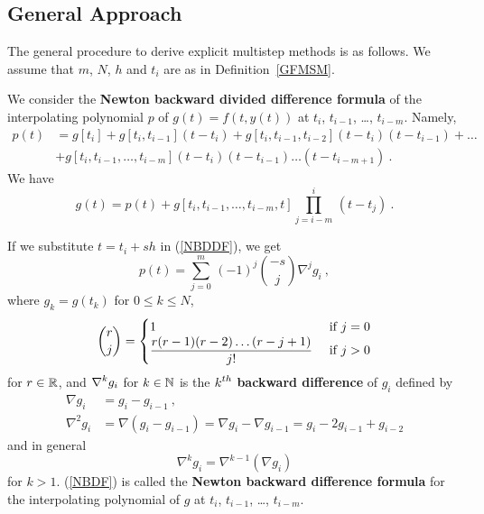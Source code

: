 \subsection{General Approach}

The general procedure to derive explicit multistep methods is as
follows.  We assume that $m$, $N$, $h$ and $t_i$ are as in
Definition~\ref{GFMSM}.

We consider the
{\bfseries Newton backward divided difference formula} 
of the interpolating polynomial $p$ of $g(t) = f(t,y(t))$ at
$t_i$, $t_{i-1}$, \ldots, $t_{i-m}$.  Namely,
\begin{equation} \label{NBDDF}
\begin{split}
p(t) & = g[t_i] + g[t_i,t_{i-1}](t-t_i) +
g[t_i,t_{i-1},t_{i-2}](t-t_i)(t-t_{i-1}) + \ldots \\
 &+ g[t_i,t_{i-1},\ldots,t_{i-m}](t-t_i)(t-t_{i-1})\ldots(t-t_{i-m+1}) \ .
\end{split}
\end{equation}
We have
\begin{equation} \label{errorNBDDF}
g(t) = p(t) +
g[t_i,t_{i-1},\ldots,t_{i-m},t]\prod_{j=i-m}^i\,(t-t_j) \ .
\end{equation}

If we substitute $t=t_i + sh$ in (\ref{NBDDF}), we get
\begin{equation} \label{NBDF}
p(t) = \sum_{j=0}^m\,(-1)^j \binom{-s}{j}\nabla^j g_i \ ,
\end{equation}
where $g_k = g(t_k)$ for $0 \leq k \leq N$,
\[
\binom{r}{j} = \begin{cases}
  1 & \text{ if $j=0$} \\
\displaystyle \frac{r(r-1)(r-2)\ldots(r-j+1)}{j!} & \text{ if $j>0$}
  \end{cases}
\]
for $r \in \mathbb{R}$, and $\displaystyle \nabla^k g_i$ for $k \in \mathbb{N}$ is
the $\displaystyle k^{th}$
{\bfseries backward difference} of $g_i$ defined by
\begin{align*}
\nabla g_i &= g_i - g_{i-1} \ , \\
\nabla^2 g_i &= \nabla (g_i - g_{i-1})
= \nabla g_i - \nabla g_{i-1} = g_i - 2 g_{i-1} + g_{i-2}
\end{align*}
and in general
\[
\nabla^k g_i = \nabla^{k-1}\left(\nabla g_i \right)
\]
for $k>1$.  (\ref{NBDF}) is called the
{\bfseries Newton backward difference formula} for the interpolating 
polynomial of $g$ at $t_i$, $t_{i-1}$, \ldots, $t_{i-m}$.

